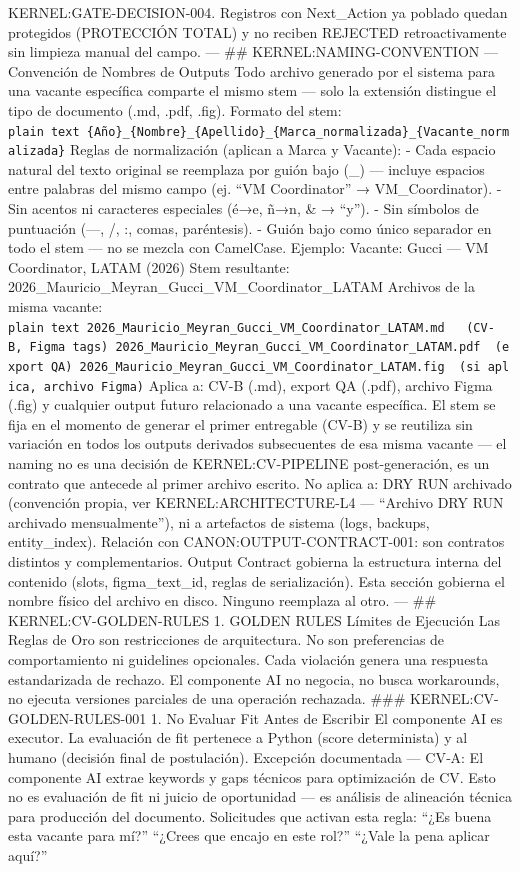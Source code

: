 \documentclass[
]{article}
\begin{document}
KERNEL:GATE-DECISION-004. Registros con Next\_Action ya poblado quedan
protegidos (PROTECCIÓN TOTAL) y no reciben REJECTED retroactivamente sin
limpieza manual del campo. --- \#\# KERNEL:NAMING-CONVENTION ---
Convención de Nombres de Outputs Todo archivo generado por el sistema
para una vacante específica comparte el mismo stem --- solo la extensión
distingue el tipo de documento (.md, .pdf, .fig). Formato del stem:
\texttt{plain\ text\ \{Año\}\_\{Nombre\}\_\{Apellido\}\_\{Marca\_normalizada\}\_\{Vacante\_normalizada\}}
Reglas de normalización (aplican a Marca y Vacante): - Cada espacio
natural del texto original se reemplaza por guión bajo (\_) --- incluye
espacios entre palabras del mismo campo (ej. ``VM Coordinator'' →
VM\_Coordinator). - Sin acentos ni caracteres especiales (é→e, ñ→n, \& →
``y''). - Sin símbolos de puntuación (---, /, :, comas, paréntesis). -
Guión bajo como único separador en todo el stem --- no se mezcla con
CamelCase. Ejemplo: Vacante: Gucci --- VM Coordinator, LATAM (2026) Stem
resultante: 2026\_Mauricio\_Meyran\_Gucci\_VM\_Coordinator\_LATAM
Archivos de la misma vacante:
\texttt{plain\ text\ 2026\_Mauricio\_Meyran\_Gucci\_VM\_Coordinator\_LATAM.md\ \ \ (CV-B,\ Figma\ tags)\ 2026\_Mauricio\_Meyran\_Gucci\_VM\_Coordinator\_LATAM.pdf\ \ (export\ QA)\ 2026\_Mauricio\_Meyran\_Gucci\_VM\_Coordinator\_LATAM.fig\ \ (si\ aplica,\ archivo\ Figma)}
Aplica a: CV-B (.md), export QA (.pdf), archivo Figma (.fig) y cualquier
output futuro relacionado a una vacante específica. El stem se fija en
el momento de generar el primer entregable (CV-B) y se reutiliza sin
variación en todos los outputs derivados subsecuentes de esa misma
vacante --- el naming no es una decisión de KERNEL:CV-PIPELINE
post-generación, es un contrato que antecede al primer archivo escrito.
No aplica a: DRY RUN archivado (convención propia, ver
KERNEL:ARCHITECTURE-L4 --- ``Archivo DRY RUN archivado mensualmente''),
ni a artefactos de sistema (logs, backups, entity\_index). Relación con
CANON:OUTPUT-CONTRACT-001: son contratos distintos y complementarios.
Output Contract gobierna la estructura interna del contenido (slots,
figma\_text\_id, reglas de serialización). Esta sección gobierna el
nombre físico del archivo en disco. Ninguno reemplaza al otro. --- \#\#
KERNEL:CV-GOLDEN-RULES 1. GOLDEN RULES Límites de Ejecución Las Reglas
de Oro son restricciones de arquitectura. No son preferencias de
comportamiento ni guidelines opcionales. Cada violación genera una
respuesta estandarizada de rechazo. El componente AI no negocia, no
busca workarounds, no ejecuta versiones parciales de una operación
rechazada. \#\#\# KERNEL:CV-GOLDEN-RULES-001 1. No Evaluar Fit Antes de
Escribir El componente AI es executor. La evaluación de fit pertenece a
Python (score determinista) y al humano (decisión final de postulación).
Excepción documentada --- CV‑A: El componente AI extrae keywords y gaps
técnicos para optimización de CV. Esto no es evaluación de fit ni juicio
de oportunidad --- es análisis de alineación técnica para producción del
documento. Solicitudes que activan esta regla: ``¿Es buena esta vacante
para mí?'' ``¿Crees que encajo en este rol?'' ``¿Vale la pena aplicar
aquí?''
\end{document}
